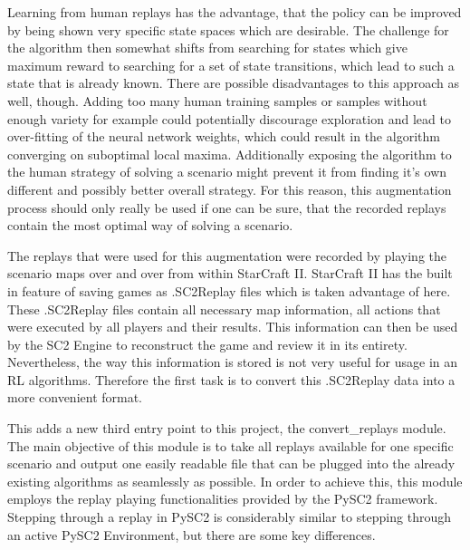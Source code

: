 Learning from human replays has the advantage, that the policy can be improved by being shown very specific state spaces which are desirable. The challenge for the algorithm then somewhat shifts from searching for states which give maximum reward to searching for a set of state transitions, which lead to such a state that is already known. There are possible disadvantages to this approach as well, though. Adding too many human training samples or samples without enough variety for example could potentially discourage exploration and lead to over-fitting of the neural network weights, which could result in the algorithm converging on suboptimal local maxima. Additionally exposing the algorithm to the human strategy of solving a scenario might prevent it from finding it's own different and possibly better overall strategy. For this reason, this augmentation process should only really be used if one can be sure, that the recorded replays contain the most optimal way of solving a scenario.

The replays that were used for this augmentation were recorded by playing the scenario maps over and over from within StarCraft II. StarCraft II has the built in feature of saving games as .SC2Replay files which is taken advantage of here. These .SC2Replay files contain all necessary map information, all actions that were executed by all players and their results. This information can then be used by the SC2 Engine to reconstruct the game and review it in its entirety. Nevertheless, the way this information is stored is not very useful for usage in an RL algorithms. Therefore the first task is to convert this .SC2Replay data into a more convenient format.

This adds a new third entry point to this project, the convert\_replays module. The main objective of this module is to take all replays available for one specific scenario and output one easily readable file that can be plugged into the already existing algorithms as seamlessly as possible.
In order to achieve this, this module employs the replay playing functionalities provided by the PySC2 framework. Stepping through a replay in PySC2 is considerably similar to stepping through an active PySC2 Environment, but there are some key differences.

